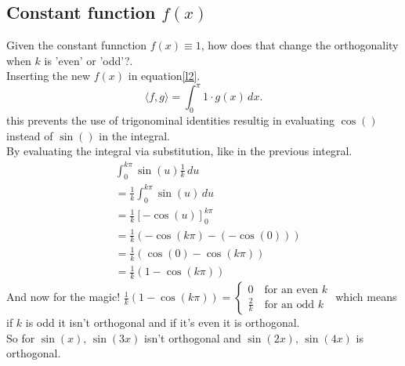 \documentclass[12pt]{article}
\begin{document}
\subsection*{Constant function $f(x)$}
Given the constant funnction $f(x) \equiv 1$, how does that change the orthogonality when $k$ is 'even' or 'odd'?.\\
Inserting the new $f(x)$ in equation\eqref{l2}.
\begin{equation*}
    \langle f,g \rangle = \int_{0}^{\pi} 1 \cdot g(x) \, dx.
\end{equation*}
this prevents the use of trigonominal identities resultig in evaluating $\cos()$ instead of $\sin()$ in the integral.\\
By evaluating the integral via substitution, like in the previous integral.
\begin{align*}
    & \int_{0}^{k\pi} \sin(u) \frac{1}{k}\, du\\
    & = \frac{1}{k} \int_{0}^{k\pi} \sin(u) \, du\\
    & = \frac{1}{k}[-\cos(u)]_{0}^{k\pi} \\
    & = \frac{1}{k}(-\cos(k\pi)-(-\cos(0))) \\
    & = \frac{1}{k} (\cos(0)-\cos(k\pi))\\
    & = \frac{1}{k}(1 - \cos(k\pi))
\end{align*}
And now for the magic!
$\frac{1}{k}(1 - \cos(k\pi)) =
\begin{cases}
    0 \quad \text{for an even } k   \\
    \frac{2}{k} \quad \text{for an odd } k
\end{cases}
$
which means if $k$ is odd it isn't orthogonal and if it's even it is orthogonal.\\
So for $\sin(x),\,\sin(3x)$ isn't orthogonal and $\sin(2x),\, \sin(4x)$ is orthogonal.
\end{document}
